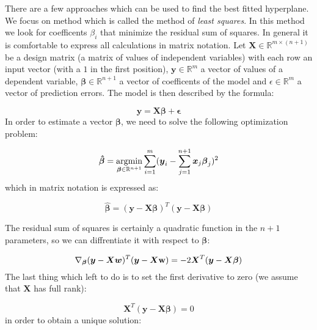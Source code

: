There are a few approaches which can be used to find the best fitted hyperplane. We focus on method which is called the method of \textit{least squares}. In this method we look for coefficents $\beta_i$ that minimize the residual sum of squares. In general it is comfortable to express all calculations in matrix notation. Let $\boldsymbol{X} \in \mathbb{R}^{m \times (n+1)}$ be a design matrix (a matrix of values of independent variables) with each row an input vector (with a $1$ in the first position), $\boldsymbol{y} \in \mathbb{R}^{m}$ a vector of values of a dependent variable, $\boldsymbol{\beta} \in \mathbb{R}^{n+1}$ a vector of coefficents of the model and $\epsilon \in \mathbb{R}^{m}$ a vector of prediction errors. The model is then described by the formula:

\begin{equation}\label{eq:LR1}
    \boldsymbol{y} = \boldsymbol{X}\boldsymbol{\beta} + \boldsymbol{\epsilon} 
\end{equation}
In order to estimate a vector $\boldsymbol{\beta}$, we need to solve the following optimization problem:

\begin{equation}\label{eq:LR2}
    \boldsymbol{\hat{\beta}} = \operatorname*{argmin}_{\boldsymbol{\beta} \in \mathbb{R}^{n+1}}\sum\limits_{i=1}^{m}(\boldsymbol{y}_{i}-\sum\limits_{j=1}^{n+1}\boldsymbol{x}_j\boldsymbol{\beta}_j)^2
\end{equation}
which in matrix notation is expressed as:

\begin{equation}\label{eq:LR3}
    \boldsymbol{\hat{\beta}} = (\boldsymbol{y}-\boldsymbol{X}\boldsymbol{\beta})^T(\boldsymbol{y}-\boldsymbol{X}\boldsymbol{\beta})
\end{equation}

The residual sum of squares is certainly a quadratic function in the $n+1$ parameters, so we can diffrentiate it with respect to $\boldsymbol{\beta}$:

\begin{equation}\label{eq:LR4}
    \nabla_{\boldsymbol{\beta}} (\boldsymbol{y}-\boldsymbol{X}\boldsymbol{w})^T(\boldsymbol{y}-\boldsymbol{X}\bold{w}) = -2\boldsymbol{X}^T(\boldsymbol{y}-\boldsymbol{X}\boldsymbol{\beta})
\end{equation}
The last thing which left to do is to set the first derivative to zero (we assume that $\boldsymbol{X}$ has full rank):

\begin{equation}\label{eq:LR4}
    \boldsymbol{X}^T(\boldsymbol{y}-\boldsymbol{X}\boldsymbol{\beta}) = 0
\end{equation}
in order to obtain a unique solution:

